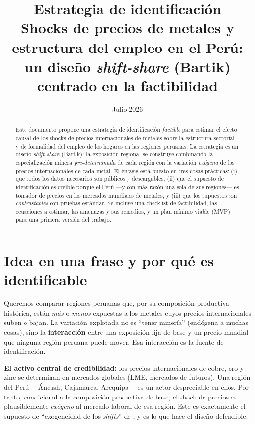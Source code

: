 \documentclass[11pt]{article}
\title{Estrategia de identificación\\
\large Shocks de precios de metales y estructura del empleo en el Perú:\\
un diseño \textit{shift-share} (Bartik) centrado en la factibilidad}
\author{}
\date{Julio 2026}
\begin{document}
\maketitle

\begin{abstract}
\noindent Este documento propone una estrategia de identificación \emph{factible} para
estimar el efecto causal de los shocks de precios internacionales de metales sobre la
estructura sectorial y de formalidad del empleo de los hogares en las regiones peruanas.
La estrategia es un diseño \textit{shift-share} (Bartik): la exposición regional se construye
combinando la especialización minera \emph{pre-determinada} de cada región con la variación
\emph{exógena} de los precios internacionales de cada metal. El énfasis está puesto en tres
cosas prácticas: (i) que todos los datos necesarios son públicos y descargables; (ii) que el
supuesto de identificación es creíble porque el Perú —y con más razón una sola de sus
regiones— es tomador de precios en los mercados mundiales de metales; y (iii) que los
supuestos son \emph{contrastables} con pruebas estándar. Se incluye una checklist de
factibilidad, las ecuaciones a estimar, las amenazas y sus remedios, y un plan mínimo
viable (MVP) para una primera versión del trabajo.
\end{abstract}

\tableofcontents

\section{Idea en una frase y por qué es identificable}
Queremos comparar regiones peruanas que, por su composición productiva histórica, están
\emph{más} o \emph{menos} expuestas a los metales cuyos precios internacionales suben o bajan.
La variación explotada no es ``tener minería'' (endógena a muchas cosas), sino la
\textbf{interacción} entre una exposición fija de base y un precio mundial que ninguna región
peruana puede mover. Esa interacción es la fuente de identificación.

\medskip
\noindent\textbf{El activo central de credibilidad:} los precios internacionales de cobre, oro
y zinc se determinan en mercados globales (LME, mercados de futuros). Una región del Perú
—Áncash, Cajamarca, Arequipa— es un actor despreciable en ellos. Por tanto, condicional a la
composición productiva de base, el shock de precios es plausiblemente \emph{exógeno} al
mercado laboral de esa región. Este es exactamente el supuesto de ``exogeneidad de los
\textit{shifts}'' de \citet{borusyak2022}, y es lo que hace el diseño defendible.
\end{document}
